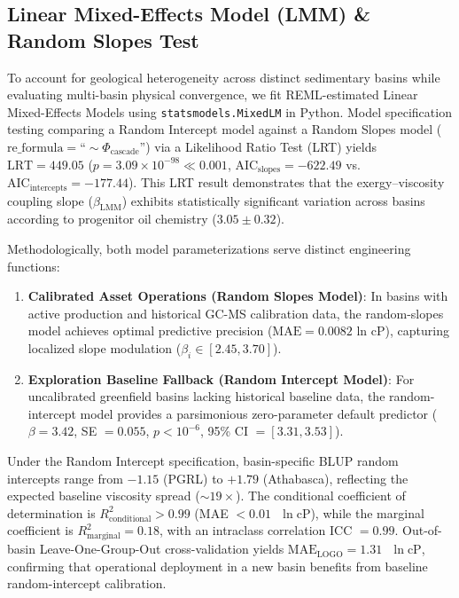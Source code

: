\documentclass[review,12pt]{elsarticle}
\begin{document}
\subsection{Linear Mixed-Effects Model (LMM) \& Random Slopes Test}
To account for geological heterogeneity across distinct sedimentary basins while evaluating multi-basin physical convergence, we fit REML-estimated Linear Mixed-Effects Models using \texttt{statsmodels.MixedLM} in Python. Model specification testing comparing a Random Intercept model against a Random Slopes model ($\text{re\_formula} = \text{``}\sim\Phi_{\text{cascade}}\text{''}$) via a Likelihood Ratio Test (LRT) yields $\text{LRT} = 449.05$ ($p = 3.09 \times 10^{-98} \ll 0.001$, $\text{AIC}_{\text{slopes}} = -622.49$ vs.\ $\text{AIC}_{\text{intercepts}} = -177.44$). This LRT result demonstrates that the exergy--viscosity coupling slope ($\beta_{\text{LMM}}$) exhibits statistically significant variation across basins according to progenitor oil chemistry ($3.05 \pm 0.32$). 

Methodologically, both model parameterizations serve distinct engineering functions:
\begin{enumerate}
    \item \textbf{Calibrated Asset Operations (Random Slopes Model)}: In basins with active production and historical GC-MS calibration data, the random-slopes model achieves optimal predictive precision ($\text{MAE} = 0.0082\text{ ln cP}$), capturing localized slope modulation ($\beta_i \in [2.45, 3.70]$).
    \item \textbf{Exploration Baseline Fallback (Random Intercept Model)}: For uncalibrated greenfield basins lacking historical baseline data, the random-intercept model provides a parsimonious zero-parameter default predictor ($\beta = 3.42$, SE $= 0.055$, $p < 10^{-6}$, 95\% CI $= [3.31, 3.53]$).
\end{enumerate}

Under the Random Intercept specification, basin-specific BLUP random intercepts range from $-1.15$ (PGRL) to $+1.79$ (Athabasca), reflecting the expected baseline viscosity spread ($\sim 19\times$). The conditional coefficient of determination is $R^2_{\text{conditional}} > 0.99$ (MAE $< 0.01\text{ }\ln\text{cP}$), while the marginal coefficient is $R^2_{\text{marginal}} = 0.18$, with an intraclass correlation ICC $= 0.99$. Out-of-basin Leave-One-Group-Out cross-validation yields $\text{MAE}_{\text{LOGO}} = 1.31\text{ }\ln\text{cP}$, confirming that operational deployment in a new basin benefits from baseline random-intercept calibration.
\end{document}
